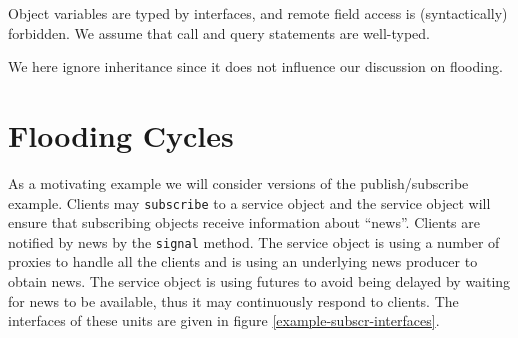 \documentclass[12pt]{article}%
\begin{document}
%
Object variables are typed by interfaces, 
and remote field access is (syntactically) forbidden.
We assume that call and query statements are
well-typed.  
We here ignore inheritance since it
does not influence our discussion on flooding.



\section{Flooding Cycles}

As a motivating example we will
consider  versions of the publish/subscribe example.
Clients may  \lstinline{subscribe} to a service object
and the service object will ensure 
that subscribing objects receive information about ``news''.
Clients are notified by news by 
 the   \lstinline{signal} method.
The service object is using a number of proxies to 
handle all the clients and is using  an underlying news producer
to obtain news. The service object is using futures to avoid
being delayed by waiting for news to be available,
thus it may continuously respond to clients.
The  interfaces of these units are given 
in figure \ref{example-subscr-interfaces}.
\end{document}
